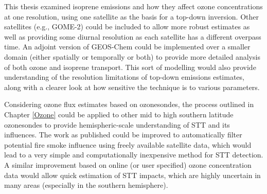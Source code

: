 {  This thesis examined isoprene emissions and how they affect ozone concentrations at one resolution, using one satellite as the basis for a top-down inversion.
  Other satellites (e.g., GOME-2) could be included to allow more robust estimates as well as providing some diurnal resolution as each satellite has a different overpass time.
  An adjoint version of GEOS-Chem could be implemented over a smaller domain (either spatially or temporally or both) to provide more detailed analysis of both ozone and isoprene transport.
  This sort of modelling would also provide understanding of the resolution limitations of top-down emissions estimates, along with a clearer look at how sensitive the technique is to various parameters.
  
  Considering ozone flux estimates based on ozonesondes, the process outlined in Chapter \ref{Ozone} could be applied to other mid to high southern latitude ozonesondes to provide hemispheric-scale understanding of STT and its influences.
  The work as published could be improved to automatically filter potential fire smoke influence using freely available satellite data, which would lead to a very simple and computationally inexpensive method for STT detection.
  A similar improvement based on online (or user specified) ozone concentration data would allow quick estimation of STT impacts, which are highly uncertain in many areas (especially in the southern hemisphere).
  
}
